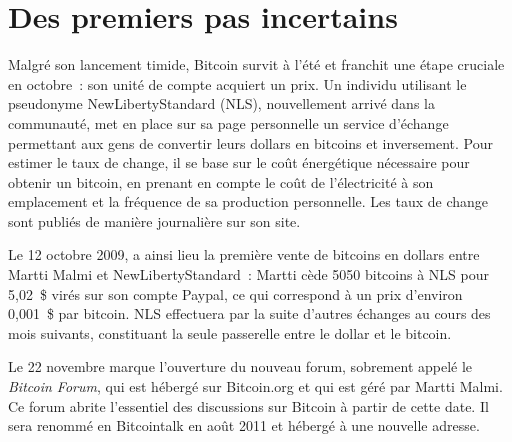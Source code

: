 
\section*{Des premiers pas incertains}

Malgré son lancement timide, Bitcoin survit à l'été et franchit une étape cruciale en octobre~: son unité de compte acquiert un prix. Un individu utilisant le pseudonyme NewLibertyStandard (NLS), nouvellement arrivé dans la communauté, met en place sur sa page personnelle un service d'échange permettant aux gens de convertir leurs dollars en bitcoins et inversement. Pour estimer le taux de change, il se base sur le coût énergétique nécessaire pour obtenir un bitcoin, en prenant en compte le coût de l'électricité à son emplacement et la fréquence de sa production personnelle. Les taux de change sont publiés de manière journalière sur son site.

Le 12 octobre 2009, a ainsi lieu la première vente de bitcoins en dollars entre Martti Malmi et NewLibertyStandard~: Martti cède 5050 bitcoins à NLS pour 5,02~\$ virés sur son compte Paypal, ce qui correspond à un prix d'environ 0,001~\$ par bitcoin. NLS effectuera par la suite d'autres échanges au cours des mois suivants, constituant la seule passerelle entre le dollar et le bitcoin.


Le 22 novembre marque l'ouverture du nouveau forum, sobrement appelé le \emph{Bitcoin Forum}, qui est hébergé sur Bitcoin.org et qui est géré par Martti Malmi. Ce forum abrite l'essentiel des discussions sur Bitcoin à partir de cette date. Il sera renommé en Bitcointalk en août 2011 et hébergé à une nouvelle adresse.

